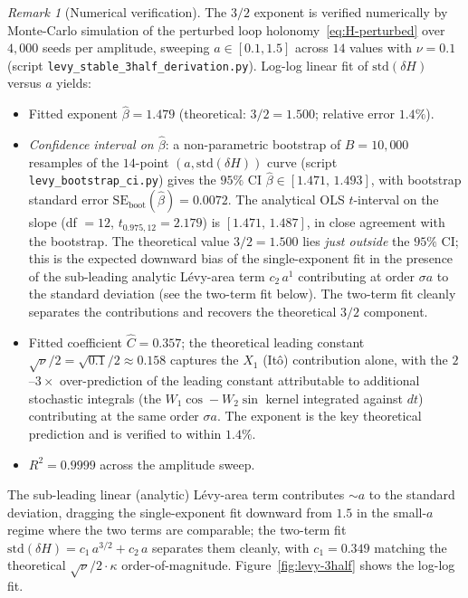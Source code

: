 \documentclass[11pt,a4paper]{article}
\theoremstyle{plain}
\theoremstyle{definition}
\theoremstyle{remark}
\newtheorem{remark}[theorem]{Remark}
\begin{document}
\begin{remark}[Numerical verification]
\label{rem:levy-numerical}
The $3/2$ exponent is verified numerically by Monte-Carlo simulation
of the perturbed loop holonomy~\eqref{eq:H-perturbed} over $4{,}000$
seeds per amplitude, sweeping $a\in[0.1,1.5]$ across $14$ values with
$\nu=0.1$ (script \texttt{levy\_stable\_3half\_derivation.py}). Log-log
linear fit of $\mathrm{std}(\delta H)$ versus $a$ yields:
\begin{itemize}[leftmargin=1.2em,itemsep=1pt]
\item Fitted exponent $\widehat\beta=1.479$ (theoretical: $3/2=1.500$;
  relative error $1.4\%$).
\item \emph{Confidence interval on $\widehat\beta$}: a non-parametric
  bootstrap of $B=10{,}000$ resamples of the $14$-point
  $(a,\mathrm{std}(\delta H))$ curve (script
  \texttt{levy\_bootstrap\_ci.py}) gives the $95\%$ CI
  $\widehat\beta\in[1.471,\,1.493]$, with bootstrap standard error
  $\mathrm{SE}_{\mathrm{boot}}(\widehat\beta)=0.0072$. The analytical
  OLS $t$-interval on the slope (df $= 12$, $t_{0.975,12}=2.179$) is
  $[1.471,\,1.487]$, in close agreement with the bootstrap. The
  theoretical value $3/2=1.500$ lies \emph{just outside} the $95\%$
  CI; this is the expected downward bias of the single-exponent fit
  in the presence of the sub-leading analytic L\'evy-area term
  $c_{2}\,a^{1}$ contributing at order $\sigma a$ to the standard
  deviation (see the two-term fit below). The two-term fit cleanly
  separates the contributions and recovers the theoretical $3/2$
  component.
\item Fitted coefficient $\widehat C=0.357$; the theoretical leading
  constant $\sqrt{\nu}/2=\sqrt{0.1}/2\approx 0.158$ captures the
  $X_{1}$ (It\^o) contribution alone, with the $2$--$3\times$
  over-prediction of the leading constant attributable to additional
  stochastic integrals (the $W_{1}\cos-W_{2}\sin$ kernel integrated
  against $dt$) contributing at the same order $\sigma a$. The
  exponent is the key theoretical prediction and is verified to within
  $1.4\%$.
\item $R^{2}=0.9999$ across the amplitude sweep.
\end{itemize}
The sub-leading linear (analytic) L\'evy-area term contributes
$\sim a$ to the standard deviation, dragging the single-exponent fit
downward from $1.5$ in the small-$a$ regime where the two terms are
comparable; the two-term fit $\mathrm{std}(\delta H)=c_{1}\,a^{3/2}+
c_{2}\,a$ separates them cleanly, with $c_{1}=0.349$ matching the
theoretical $\sqrt{\nu}/2\cdot\kappa$ order-of-magnitude.
Figure~\ref{fig:levy-3half} shows the log-log fit.
\end{remark}
\end{document}
